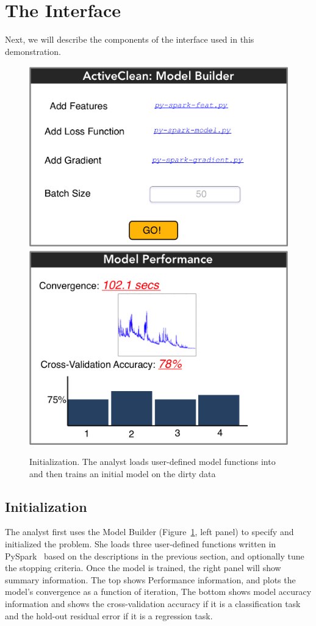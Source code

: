 \section{The Interface}
Next, we will describe the components of the \sys interface used in this demonstration. 

\begin{figure}[t]
\centering
 \includegraphics[width=0.4\columnwidth]{figs/interface1.png}
 \includegraphics[width=0.43\columnwidth]{figs/interface2.png}
 \caption{Initialization. The analyst loads user-defined model functions into \sys and then trains an initial model on the dirty data \label{irun}}
\end{figure}

\subsection{Initialization}
The analyst first uses the \textsf{Model Builder} (Figure~\ref{irun}, left panel) to specify and initialized the problem.
She loads three user-defined functions written in PySpark~\cite{pyspark} based on the descriptions in the previous section, and
optionally  tune the stopping criteria.
Once the model is trained, the right panel will show summary information.
The top shows \textsf{Performance} information, and plots the model's convergence as a function of iteration,
The bottom shows model accuracy information and shows the cross-validation accuracy if it is a classification task and the hold-out residual error if it is a regression task.

